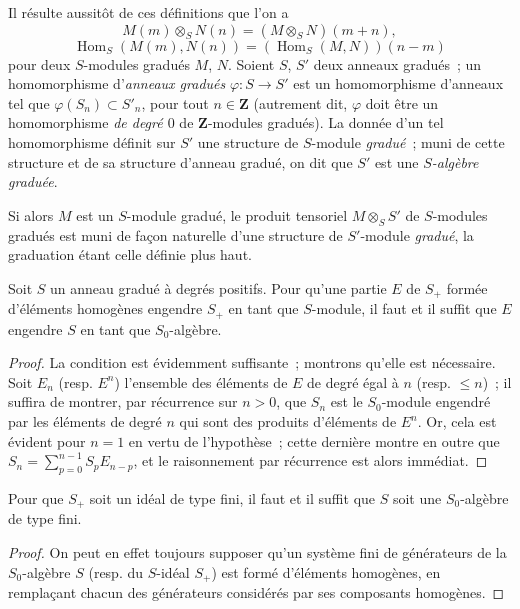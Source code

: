 \begin{env}[2.1.2]
Il résulte aussitôt de ces définitions que l'on a
\[
  \label{II.2.1.2.1-fr}
  M(m)\otimes_S N(n)=(M\otimes_S N)(m+n),
  \tag{2.1.2.1}
\]
\[
  \label{II.2.1.2.2-fr}
  \operatorname{Hom}_S(M(m),N(n))
  =(\operatorname{Hom}_S(M,N))(n-m)
  \tag{2.1.2.2}
\]
pour deux $S$-modules gradués $M$, $N$.
Soient $S$, $S'$ deux anneaux gradués~; un homomorphisme d'\emph{anneaux
gradués} $\varphi:S\to S'$ est un homomorphisme d'anneaux tel que
$\varphi(S_n)\subset S'_n$, pour tout $n\in\mathbf{Z}$ (autrement dit,
$\varphi$ doit être un homomorphisme \emph{de degré $0$} de
$\mathbf{Z}$-modules gradués). La donnée d'un tel homomorphisme définit sur
$S'$ une structure de $S$-module \emph{gradué}~; muni de cette structure et
de sa structure d'anneau gradué, on dit que $S'$ est une \emph{$S$-algèbre
graduée}.

Si alors $M$ est un $S$-module gradué, le produit tensoriel $M\otimes_S S'$
de $S$-modules gradués est muni de façon naturelle d'une structure de
$S'$-module \emph{gradué}, la graduation étant celle définie plus haut.
\end{env}

\begin{lemma}[2.1.3]
\label{II.2.1.3-fr}
Soit $S$ un anneau gradué à degrés positifs. Pour qu'une partie $E$ de $S_+$
formée d'éléments homogènes engendre $S_+$ en tant que $S$-module, il faut et
il suffit que $E$ engendre $S$ en tant que $S_0$-algèbre.
\end{lemma}

\begin{proof}
La condition est évidemment suffisante~; montrons qu'elle est nécessaire.
Soit $E_n$ (resp. $E^n$) l'ensemble des éléments de $E$ de degré égal à $n$
(resp. $\leq n$)~; il suffira de montrer, par récurrence sur $n>0$, que $S_n$
est le $S_0$-module engendré par les éléments de degré $n$ qui sont des
produits d'éléments de $E^n$. Or, cela est évident pour $n=1$ en vertu de
l'hypothèse~; cette dernière montre en outre que
$S_n=\sum_{p=0}^{n-1}S_pE_{n-p}$, et le raisonnement par récurrence est alors
immédiat.
\end{proof}

\begin{corollary}[2.1.4]
\label{II.2.1.4-fr}
Pour que $S_+$ soit un idéal de type fini, il faut et il suffit que $S$ soit
une $S_0$-algèbre de type fini.
\end{corollary}

\begin{proof}
On peut en effet toujours supposer qu'un système fini de générateurs de la
$S_0$-algèbre $S$ (resp. du $S$-idéal $S_+$) est formé d'éléments homogènes,
en remplaçant chacun des générateurs considérés par ses composants homogènes.
\end{proof}


